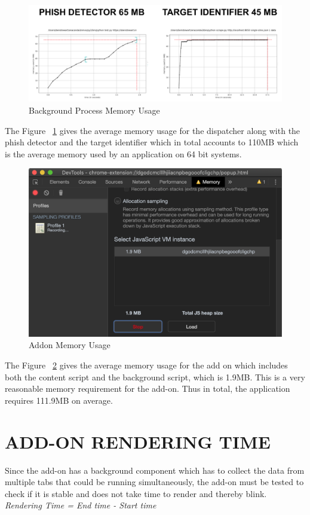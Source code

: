 \begin{figure}[htp]
\centering
\includegraphics[scale=0.5]{Figures/image15.png}
\caption{Background Process Memory Usage}
\label{fig:bpmu}
\end{figure}

The Figure ~\ref{fig:bpmu} gives the average memory usage for the dispatcher along with the phish detector and the target identifier which in total accounts to 110MB which is the average memory used by an application on 64 bit systems.

\begin{figure}[htp]
\centering
\includegraphics[scale=0.5]{Figures/image6.png}
\caption{Addon Memory Usage}
\label{fig:amu}
\end{figure}

The Figure ~\ref{fig:amu} gives the average memory usage for the add on which includes both the content script and the background script, which is 1.9MB. This is a very reasonable memory requirement for the add-on. Thus in total, the application requires 111.9MB on average.

\section{ADD-ON RENDERING TIME}
Since the add-on has a background component which has to collect the data from multiple tabs that could be running simultaneously, the add-on must be tested to check if it is stable and does not take time to render and thereby blink.\\
\null\quad\textit{Rendering Time = End time - Start time}\\


